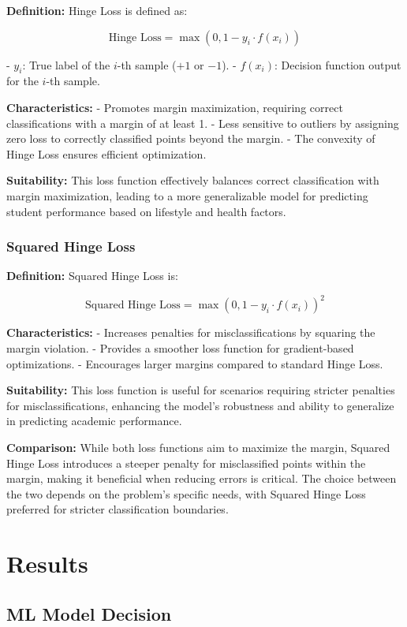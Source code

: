 \documentclass[titlepage]{article}
\begin{document}
\quad \textbf{Definition:} Hinge Loss is defined as:

\[
\text{Hinge Loss} = \max(0, 1 - y_i \cdot f(x_i))
\]

- \textbf{\( y_i \)}: True label of the \(i\)-th sample (\(+1\) or \(-1\)).
- \textbf{\( f(x_i) \)}: Decision function output for the \(i\)-th sample.

\quad \textbf{Characteristics:} 
- Promotes margin maximization, requiring correct classifications with a margin of at least 1.
- Less sensitive to outliers by assigning zero loss to correctly classified points beyond the margin.
- The convexity of Hinge Loss ensures efficient optimization.

\quad \textbf{Suitability:} This loss function effectively balances correct classification with margin maximization, leading to a more generalizable model for predicting student performance based on lifestyle and health factors.

\subsubsection{Squared Hinge Loss}

\quad \textbf{Definition:} Squared Hinge Loss is:

\[
\text{Squared Hinge Loss} = \max(0, 1 - y_i \cdot f(x_i))^2
\]

\quad \textbf{Characteristics:} 
- Increases penalties for misclassifications by squaring the margin violation.
- Provides a smoother loss function for gradient-based optimizations.
- Encourages larger margins compared to standard Hinge Loss.

\quad \textbf{Suitability:} This loss function is useful for scenarios requiring stricter penalties for misclassifications, enhancing the model's robustness and ability to generalize in predicting academic performance.

\quad \textbf{Comparison:} While both loss functions aim to maximize the margin, Squared Hinge Loss introduces a steeper penalty for misclassified points within the margin, making it beneficial when reducing errors is critical. The choice between the two depends on the problem's specific needs, with Squared Hinge Loss preferred for stricter classification boundaries.


\section{Results}

\subsection{ML Model Decision}
\end{document}
